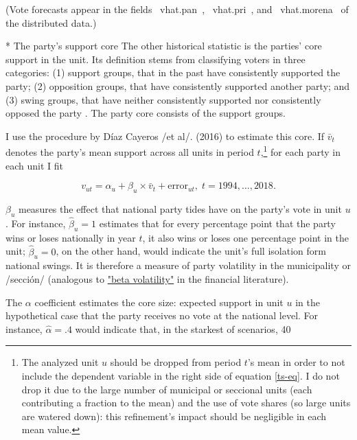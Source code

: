\documentclass[letter,12pt]{article}
\begin{document}
(Vote forecasts appear in the fields ~vhat.pan~, ~vhat.pri~, and ~vhat.morena~ of the distributed data.)

* The party's support core
The other historical statistic is the parties' core support in the unit. Its definition stems from classifying voters in three categories: (1) support groups, that in the past have consistently supported the party; (2) opposition groups, that have consistently supported another party; and (3) swing groups, that have neither consistently supported nor consistently opposed the party \citep{cox.mccubbins.1986}. The party core consists of the support groups. 

I use the procedure by Díaz Cayeros /et al/. (2016) to estimate this core. If $\bar{v}_t$ denotes the party's mean support across all units in period $t$,\footnote{The analyzed unit $u$ should be dropped from period $t$'s mean in order to not include the dependent variable in the right side of equation \ref{ts-eq}. I do not drop it due to the large number of municipal or seccional units (each contributing a fraction to the mean) and the use of vote shares (so large units are watered down): this refinement's impact should be negligible in each mean value.} for each party in each unit I fit

\begin{equation}
v_{ut} = \alpha_u + \beta_u \times \bar{v}_t + \text{error}_{ut}, \; t = 1994, \ldots, 2018.
\end{equation}\label{alpha-eq}

$\beta_u$ measures the effect that national party tides have on the party's vote in unit $u$. For instance, $\hat{\beta}_u=1$ estimates that for every percentage point that the party wins or loses nationally in year $t$, it also wins or loses one percentage point in the unit; $\hat{\beta}_u=0$, on the other hand, would indicate the unit's full isolation form national swings. It is therefore a measure of party volatility in the municipality or /sección/ (analogous to \href{https://www.investopedia.com/terms/v/volatility.asp}{"beta volatility"} in the financial literature). 

The $\alpha$ coefficient estimates the core size: expected support in unit $u$ in the hypothetical case that the party receives no vote at the national level. For instance, $\hat{\alpha}=.4$ would indicate that, in the starkest of scenarios, 40%
\end{document}
